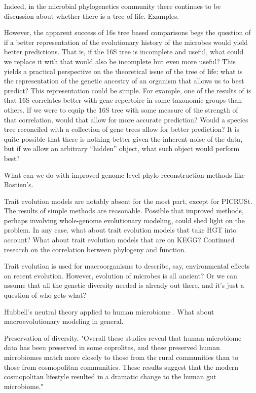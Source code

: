 \documentclass{amsart}
\begin{document}
Indeed, in the microbial phylogenetics community there continues to be discussion about whether there is a tree of life.
Examples.

However, the apparent success of 16s tree based comparisons begs the question of if a better representation of the evolutionary history of the microbes would yield better predictions.
That is, if the 16S tree is incomplete and useful, what could we replace it with that would also be incomplete but even more useful?
This yields a practical perspective on the theoretical issue of the tree of life: what is the representation of the genetic ancestry of an organism that allows us to best predict?
This representation could be simple.
For example, one of the results of \citet{zaneveld2010ribosomal} is that 16S correlates better with gene repertoire in some taxonomic groups than others.
If we were to equip the 16S tree with some measure of the strength of that correlation, would that allow for more accurate prediction?
Would a species tree reconciled with a collection of gene trees allow for better prediction?
It is quite possible that there is nothing better given the inherent noise of the data, but if we allow an arbitrary ``hidden'' object, what such object would perform best?

What can we do with improved genome-level phylo reconstruction methods like Bastien's.

Trait evolution models are notably absent for the most part, except for PICRUSt.
The results of simple methods are reasonable.
Possible that improved methods, perhaps involving whole-genome evolutionary modeling, could shed light on the problem.
In any case, what about trait evolution models that take HGT into account?
What about trait evolution models that are on KEGG?
Continued research on the correlation between phylogeny and function.

Trait evolution is used for macroorganisms to describe, say, environmental effects on recent evolution.
However, evolution of microbes is all ancient?
Or we can assume that all the genetic diversity needed is already out there, and it's just a question of who gets what?

Hubbell's neutral theory applied to human microbiome \citep{fierer2012animalcules,costello2012application}.
What about macroevolutionary modeling in general.

Preservation of diversity.
\cite{blaser2011antibiotic,cho2012human}
"Overall these studies reveal that human microbiome data has been preserved in some coprolites, and these preserved human microbiomes match more closely to those from the rural communities than to those from cosmopolitan communities. These results suggest that the modern cosmopolitan lifestyle resulted in a dramatic change to the human gut microbiome."
\end{document}
